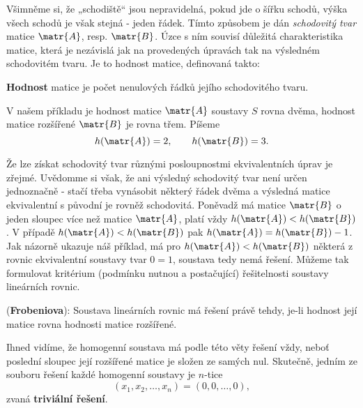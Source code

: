       Všimněme si, že „schodiště“ jsou nepravidelná, pokud jde o šířku schodů, výška všech schodů je
      však stejná - jeden řádek. Tímto způsobem je dán \emph{schodovitý tvar} matice \(\matr{A}\),
      resp. \(\matr{B}\). Úzce s ním souvisí důležitá charakteristika matice, která je nezávislá jak
      na provedených úpravách tak na výsledném schodovitém tvaru. Je to hodnost matice, definovaná
      takto:      
      \begin{mdframed}[style=highlight] 
        \textbf{Hodnost} matice je počet nenulových řádků jejího schodovitého tvaru.
      \end{mdframed}
      V našem příkladu je hodnost matice \(\matr{A}\) soustavy \(S\) rovna dvěma, hodnost matice
      rozšířené \(\matr{B}\) je rovna třem. Píšeme
      \begin{equation*}
        h(\matr{A}) = 2,\qquad h(\matr{B}) = 3.
      \end{equation*}

      \begin{tcnote}
        Že lze získat schodovitý tvar různými posloupnostmi ekvivalentních úprav je zřejmé. Uvědomme
        si však, že ani výsledný schodovitý tvar není určen jednoznačně - stačí třeba vynásobit
        některý řádek dvěma a výsledná matice ekvivalentní s původní je rovněž schodovitá. Poněvadž
        má matice \(\matr{B}\) o jeden sloupec více než matice \(\matr{A}\), platí vždy
        \(h(\matr{A}) < h(\matr{B})\). V případě \(h(\matr{A}) < h(\matr{B})\) pak \(h(\matr{A}) =
        h(\matr{B}) - 1\). Jak názorně ukazuje náš příklad, má pro \(h(\matr{A}) < h(\matr{B})\)
        některá z rovnic ekvivalentní soustavy tvar \(0 = 1\), soustava tedy nemá řešení. Můžeme tak
        formulovat kritérium (podmínku nutnou a postačující) řešitelnosti soustavy lineárních
        rovnic.
      \end{tcnote}
      
      \begin{lemma}\label{mai:lemma001}
        (\textbf{Frobeniova}): Soustava lineárních rovnic má řešení právě tehdy, je-li hodnost její
        matice rovna hodnosti matice rozšířené.
      \end{lemma}
      
      Ihned vidíme, že homogenní soustava má podle této věty řešení vždy, neboť poslední sloupec
      její rozšířené matice je složen ze samých nul. Skutečně, jedním ze souboru řešení každé
      homogenní soustavy je \(n\)-tice
      \begin{equation*}
        (x_1, x_2, \ldots, x_n) = (0, 0, \ldots, 0),
      \end{equation*}
      zvaná \textbf{triviální řešení}.
      
